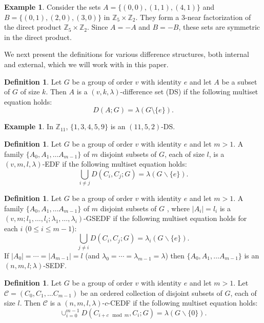 \documentclass[12pt, a4paper]{article}
\theoremstyle{definition}
\newtheorem{example}[theorem]{Example}
\newtheorem{definition}[theorem]{Definition}
\begin{document}
\begin{example}\label{ex:ABZ_5Z_2}
Consider the sets $A=\{(0,0),(1,1),(4,1)\}$ and $B=\{(0,1),(2,0),(3,0)\}$ in $\mathbb{Z}_5 \times \mathbb{Z}_2$.  They form a $3$-near factorization of the direct product $\mathbb{Z}_5 \times \mathbb{Z}_2$. Since $A=-A$ and $B=-B$, these sets are symmetric in the direct product.
\end{example}

We next present the definitions for various difference structures, both internal and external, which we will work with in this paper.

\begin{definition}
Let $G$ be a group of order $v$ with identity $e$ and let $A$ be a subset of $G$ of size $k$.  Then $A$ is a $(v,k,\lambda)$-difference set (DS) if the following multiset equation holds:
\[ D(A;G)=\lambda(G \setminus \{e\}).\]
\end{definition}

\begin{example}
In $\mathbb{Z}_{11}$, $\{1,3,4,5,9\}$ is an $(11,5,2)$-DS.
\end{example}

\begin{definition}
Let $G$ be a group of order $v$ with identity $e$ and let $m >1$. A family $\{A_0,A_1,\ldots A_{m-1}\}$ of $m$ disjoint subsets of $G$, each of size $l$, is a $(v,m,l,\lambda)$-EDF if the following multiset equation holds:
    \[\bigcup_{i \neq j}D(C_i,C_j;G)=\lambda(G\backslash\{e\}).\]
\end{definition}

\begin{definition}\label{def:GSEDF}
Let $G$ be a group of order $v$ with identity $e$ and let $m >1$. A family $\{A_0,A_1,\ldots A_{m-1}\}$ of $m$ disjoint subsets of $G$ , where $|A_i|=l_i$ is a $(v,m;l_1,\ldots,l_i; \lambda_1, \ldots, \lambda_i)$-GSEDF if the following multiset equation holds for each $i$ ($0 \leq i \leq m-1$):
    \[\bigcup_{j \neq i} D(C_i,C_j;G)=\lambda_i(G\backslash\{e\}).\]
If $|A_0|= \cdots =|A_{m-1}|=l$ (and $\lambda_0= \cdots = \lambda_{m-1}=\lambda$)  then $\{A_0,A_1,\ldots A_{m-1}\}$ is an $(n,m,l; \lambda)$-SEDF. 
\end{definition}

\begin{definition}
    Let $G$ be a group of order $v$ with identity $e$ and let $m >1$. Let $\mathcal{C}=(C_0,C_1,\ldots C_{m-1})$ be an ordered collection of disjoint subsets of $G$, each of size $l$. Then $\mathcal{C}$ is a $(n,m,l,\lambda)$-$c$-CEDF if the following multiset equation holds:
    \[\cup_{i=0}^{m-1}D(C_{i+c \mod m},C_i;G)=\lambda(G\backslash\{0\}).\]
\end{definition}
\end{document}
